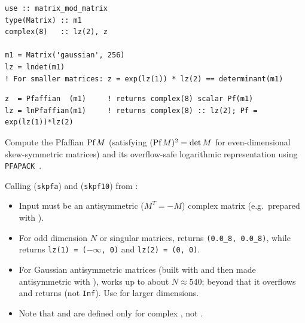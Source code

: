 \lstset{language=[95]Fortran}
\begin{lstlisting}
use :: matrix_mod_matrix
type(Matrix) :: m1
complex(8)   :: lz(2), z

m1 = Matrix('gaussian', 256)
lz = lndet(m1)
! For smaller matrices: z = exp(lz(1)) * lz(2) == determinant(m1)
\end{lstlisting}


\lstset{language=[95]Fortran}
\begin{lstlisting}
z  = Pfaffian  (m1)     ! returns complex(8) scalar Pf(m1)
lz = lnPfaffian(m1)     ! returns complex(8) :: lz(2); Pf = exp(lz(1))*lz(2)
\end{lstlisting}

Compute the Pfaffian $\text{Pf}\, M$ (satisfying $(\text{Pf}\, M)^2 = \det M$ for even-dimensional skew-symmetric matrices) and its overflow-safe logarithmic representation using \texttt{PFAPACK}~\cite{Wimmer_2012,pfapack}.

Calling  (\texttt{skpfa}) and  (\texttt{skpf10}) from :
\begin{itemize}
  \item Input  must be an antisymmetric ($M^T = -M$) complex matrix (e.g.\ prepared with ).
  \item For odd dimension $N$ or singular matrices,  returns \texttt{(0.0\_8, 0.0\_8)}, while  returns \texttt{lz(1) = (}$-\infty$\texttt{, 0)} and \texttt{lz(2) = (0, 0)}.
  \item For Gaussian antisymmetric matrices (built with  and then made antisymmetric with ),  works up to about $N \approx 540$; beyond that it overflows and returns  (not \texttt{Inf}). Use  for larger dimensions.
  \item Note that  and  are defined only for complex , not .
\end{itemize}


